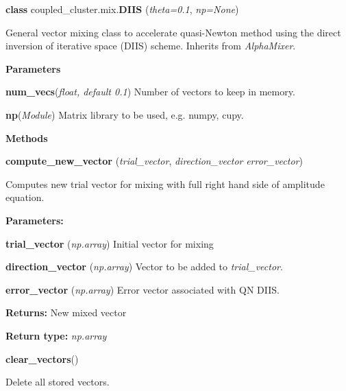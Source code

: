 \begin{tcolorbox}
    {\selectfont
    \textbf{class} coupled\_cluster.mix.\textbf{DIIS}
    (\emph{theta=0.1}, \emph{np=None})

    \vspace{1em}
    General vector mixing class to accelerate quasi-Newton method using the 
    direct inversion of iterative space (DIIS) scheme. Inherits from 
    \emph{AlphaMixer}.
        
    \vspace{1em}
    \textbf{Parameters}

    \hspace{2em}\textbf{num\_vecs}(\emph{float, default 0.1}) 
        Number of vectors to keep in memory.

    \hspace{2em}\textbf{np}(\emph{Module})
        Matrix library to be used, e.g. numpy, cupy.

    \vspace{1em} 
    \textbf{Methods}

    \hspace{2em} \textbf{compute\_new\_vector}
        (\emph{trial\_vector}, \emph{direction\_vector} \emph{error\_vector})

        \begin{adjustwidth}{4em}{}
        Computes new trial vector for mixing with full right hand side of amplitude 
        equation.

        \textbf{Parameters:} 

            \hspace{1.5em}\textbf{trial\_vector} (\emph{np.array}) 
            Initial vector for mixing

            \hspace{1.5em}\textbf{direction\_vector} (\emph{np.array})
            Vector to be added to \emph{trial\_vector}.

            \hspace{1.5em}\textbf{error\_vector} (\emph{np.array})
            Error vector associated with QN DIIS. 

        \textbf{Returns:} New mixed vector

        \textbf{Return type:} \emph{np.array}
        \end{adjustwidth}

    \hspace{2em} \textbf{clear\_vectors}()
        \begin{adjustwidth}{4em}{}
        Delete all stored vectors.
        \end{adjustwidth}
    } 
\end{tcolorbox}
